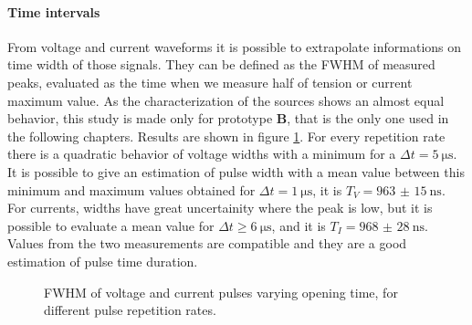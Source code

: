 \paragraph{Time intervals}
From voltage and current waveforms it is possible to extrapolate informations on time width of those signals. They can be defined as the FWHM of measured peaks, evaluated as the time when we measure half of tension or current maximum value. As the characterization of the sources shows an almost equal behavior, this study is made only for prototype \textbf{B}, that is the only one used in the following chapters. Results are shown in figure \ref{fig:times}.
For every repetition rate there is a quadratic behavior of voltage widths with a minimum for a $\Delta t = \SI{5}{\micro\second}$. It is possible to give an estimation of pulse width with a mean value between this minimum and maximum values obtained for $\Delta t = \SI{1}{\micro\second}$, it is $T_{V} = \SI{963(15)}{\nano\second}$. For currents, widths have great uncertainity where the peak is low, but it is possible to evaluate a mean value for $\Delta t \ge \SI{6}{\micro\second}$, and it is $T_{I} = \SI{968(28)}{\nano\second}$.
Values from the two measurements are compatible and they are a good estimation of pulse time duration.

\begin{figure}
 \centering
 \hfill
 \caption{FWHM of voltage and current pulses varying opening time, for different pulse repetition rates.}
 \label{fig:times}
\end{figure}


